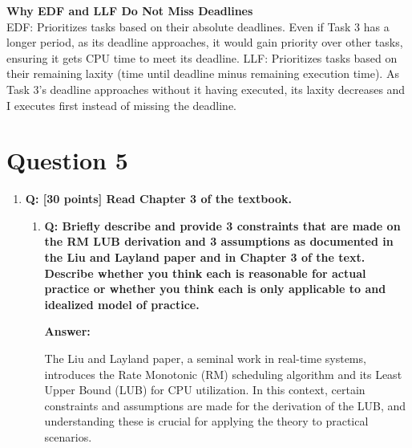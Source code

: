 \documentclass[a4paper,11pt]{article}%
\newenvironment{qanda}{\setlength{\parindent}{0pt}}{\bigskip}
\newcommand{\Q}{\bigskip\bfseries Q: }
\newcommand{\A}{\par\textbf{Answer: } \normalfont}
\begin{document}
\begin{qanda}
\begin{enumerate}
\begin{enumerate}
				      \textbf{Why EDF and LLF Do Not Miss Deadlines}\\
				      EDF: Prioritizes tasks based on their absolute deadlines. Even if Task 3 has a longer period, as its deadline approaches, it would gain priority over other tasks, ensuring it gets CPU time to meet its deadline.
				      LLF: Prioritizes tasks based on their remaining laxity (time until deadline minus remaining execution time). As Task 3's deadline approaches without it having executed, its laxity decreases and I executes first instead of missing the deadline.




			\end{enumerate}


	\end{enumerate}

	\section{Question 5}
	\begin{enumerate}
		\item[] \Q [30 points] Read Chapter 3 of the textbook.
			\begin{enumerate}
				\item \Q Briefly describe and provide 3 constraints that are made on the RM LUB derivation and 3
				      assumptions as documented in the Liu and Layland paper and in Chapter 3 of the text.
				      Describe whether you think each is reasonable for actual practice or whether you think each is only applicable to and idealized model of practice.
				      \A

				      The Liu and Layland paper, a seminal work in real-time systems, introduces the Rate Monotonic (RM) scheduling algorithm and its Least Upper Bound (LUB) for CPU utilization. In this context, certain constraints and assumptions are made for the derivation of the LUB, and understanding these is crucial for applying the theory to practical scenarios.



\end{enumerate}
\end{enumerate}
\end{qanda}
\end{document}

